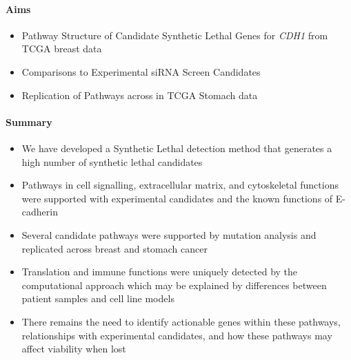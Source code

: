 \paragraph{Aims}

  \begin{itemize}
   \item Pathway Structure of Candidate Synthetic Lethal Genes for \textit{\textit{CDH1}} from TCGA breast data
   
   \bigskip
   
   \item Comparisons to Experimental siRNA Screen Candidates
   
   \bigskip
   
   \item Replication of Pathways across in TCGA Stomach data
  \end{itemize}

\paragraph{Summary}

    
  \begin{itemize}
   \item We have developed a Synthetic Lethal detection method that generates a high number of synthetic lethal candidates
   
   \bigskip
   
   \item Pathways in cell signalling, extracellular matrix, and cytoskeletal functions were supported with experimental candidates and the known functions of E-cadherin
   
   \bigskip
   
   \item Several candidate pathways were supported by mutation analysis and replicated across breast and stomach cancer
   
   \bigskip
   
   \item Translation and immune functions were uniquely detected by the computational approach which may be explained by differences between patient samples and cell line models
   
   \bigskip
   
   \item There remains the need to identify actionable genes within these pathways, relationships with experimental candidates, and how these pathways may affect viability when lost
  \end{itemize}